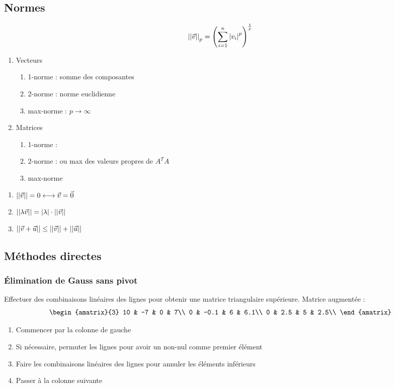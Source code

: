 \documentclass[resume]{subfiles}
\begin{document}
	\subsection{Normes}
	$$\abs{\abs{\vec{v}}}_p=\left(\sum_{i=1}^{n}\abs{v_i}^p\right)^{\frac{1}{p}}$$
	\begin{enumerate}
	\item Vecteurs
		\begin{enumerate}
	\item 1-norme : somme des composantes
	\item 2-norme : norme euclidienne
	\item max-norme : $p\to\infty$
	\end{enumerate}
	\item Matrices
	\begin{enumerate}
	\item 1-norme :
	\item 2-norme : ou max des valeurs propres de $A^{T}A$
	\item max-norme
	\end{enumerate}
	\end{enumerate}

	\begin{enumerate}
	\item $\abs{\abs{\vec{v}}}=0\longleftrightarrow \vec{v}=\vec{0}$
	\item $\abs{\abs{\lambda\vec{v}}}=\abs{\lambda}\cdot \abs{\abs{\vec{v}}}$
	\item $\abs{\abs{\vec{v}+\vec{u}}}\leq \abs{\abs{\vec{v}}}+\abs{\abs{\vec{u}}}$
	\end{enumerate}
	\subsection{Méthodes directes}
	\subsubsection{Élimination de Gauss sans pivot}
	Effectuer des combinaisons linéaires des lignes pour obtenir une matrice triangulaire supérieure. Matrice augmentée :
	$$\begin{amatrix}{3}
10 & -7 & 0 & 7\\
0 & -0.1 & 6 & 6.1\\
0 & 2.5 & 5 & 2.5\\
\end{amatrix}$$
\begin{enumerate}
\item Commencer par la colonne de gauche
\item Si nécessaire, permuter les lignes pour avoir un non-nul comme premier élément
\item Faire les combinaisons linéaires des lignes pour annuler les éléments inférieurs
\item Passer à la colonne suivante
\end{enumerate}

	
	
	
	
    


    
\end{document}
